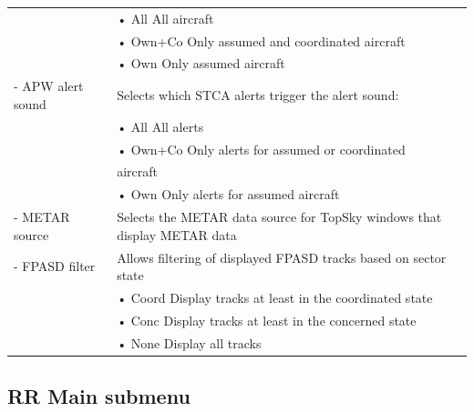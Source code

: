 \documentclass[11pt,a4paper]{memoir}
\begin{document}
\begin{tabular}{p{5cm} p{9cm}}
                          & \hspace{10pt}• All All aircraft\\
                          & \hspace{10pt}• Own+Co Only assumed and coordinated aircraft\\
                          & \hspace{10pt}• Own Only assumed aircraft\\
- APW alert sound         & Selects which STCA alerts trigger the alert sound:\\
                          & \hspace{10pt}• All All alerts\\
                          & \hspace{10pt}• Own+Co Only alerts for assumed or coordinated\\
                          & aircraft\\
                          & \hspace{10pt}• Own Only alerts for assumed aircraft\\
- METAR source            & Selects the METAR data source for TopSky windows that display METAR data\\
- FPASD filter            & Allows filtering of displayed FPASD tracks based on sector state\\
                          & \hspace{10pt}• Coord Display tracks at least in the coordinated state\\
                          & \hspace{10pt}• Conc Display tracks at least in the concerned state\\
                          & \hspace{10pt}• None Display all tracks\\
\end{tabular}
\medskip

\subsection*{RR Main submenu}
\label{menu:rr}
\end{document}
